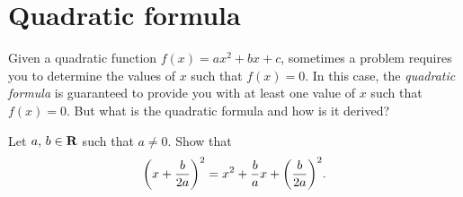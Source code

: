 \documentclass[a4paper,oneside,12pt]{article}
\begin{document}

\section{Quadratic formula}

Given a quadratic function $f(x) = ax^2 + bx + c$, sometimes a problem
requires you to determine the values of $x$ such that $f(x) = 0$.  In
this case, the \emph{quadratic formula} is guaranteed to provide you
with at least one value of $x$ such that $f(x) = 0$.  But what is the
quadratic formula and how is it derived?

\begin{exercise}
Let ${a},\, {b} \in \mathbf{R}$ such that $a \neq 0$.  Show that
\[
\parenthesis*{x + \frac{b}{2a}}^2
=
x^2 + \frac{b}{a} x + \parenthesis*{\frac{b}{2a}}^2.
\]
\end{exercise}
\end{document}
